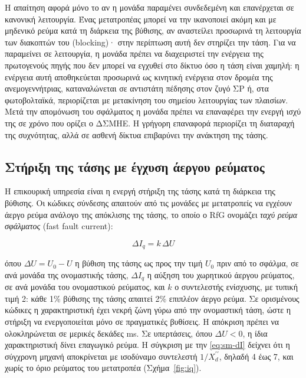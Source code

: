 Η απαίτηση αφορά μόνο το αν η μονάδα παραμένει συνδεδεμένη και επανέρχεται σε κανονική
λειτουργία. Ένας μετατροπέας μπορεί να την ικανοποιεί ακόμη και με μηδενικό ρεύμα κατά τη
διάρκεια της βύθισης, αν αναστείλει προσωρινά τη λειτουργία των διακοπτών του (blocking)· στην
περίπτωση αυτή δεν στηρίζει την τάση. Για να παραμείνει σε λειτουργία, η μονάδα πρέπει να
διαχειριστεί την ενέργεια της πρωτογενούς πηγής που δεν μπορεί να εγχυθεί στο δίκτυο όσο η
τάση είναι χαμηλή: η ενέργεια αυτή αποθηκεύεται προσωρινά ως κινητική ενέργεια στον δρομέα της
ανεμογεννήτριας, καταναλώνεται σε αντιστάτη πέδησης στον ζυγό ΣΡ ή, στα φωτοβολταϊκά,
περιορίζεται με μετακίνηση του σημείου λειτουργίας των πλαισίων. Μετά την απομόνωση του
σφάλματος η μονάδα πρέπει να επαναφέρει την ενεργή ισχύ της σε χρόνο που ορίζει ο ΔΣΜΗΕ. Η
γρήγορη επαναφορά περιορίζει τη διαταραχή της συχνότητας, αλλά σε ασθενή δίκτυα επιβαρύνει την
ανάκτηση της τάσης.

\subsection{Στήριξη της τάσης με έγχυση άεργου ρεύματος}
\label{sec:kfactor}

Η επικουρική υπηρεσία είναι η ενεργή στήριξη της τάσης κατά τη διάρκεια της βύθισης. Οι
κώδικες σύνδεσης απαιτούν από τις μονάδες με μετατροπείς να εγχέουν άεργο ρεύμα ανάλογο της
απόκλισης της τάσης, το οποίο ο RfG ονομάζει \emph{ταχύ ρεύμα σφάλματος} (fast fault current):

\begin{equation}
\Delta I_q = k\,\Delta U
\label{eq:kfactor}
\end{equation}

όπου $\Delta U = U_0 - U$ η βύθιση της τάσης ως προς την τιμή $U_0$ πριν από το σφάλμα, σε ανά
μονάδα της ονομαστικής τάσης, $\Delta I_q$ η αύξηση του χωρητικού άεργου ρεύματος, σε ανά
μονάδα του ονομαστικού ρεύματος, και $k$ ο συντελεστής ενίσχυσης, με τυπική τιμή 2: κάθε 1\%
βύθισης της τάσης απαιτεί 2\% επιπλέον άεργο ρεύμα. Σε ορισμένους κώδικες η χαρακτηριστική
έχει νεκρή ζώνη γύρω από την ονομαστική τάση, ώστε η στήριξη να ενεργοποιείται μόνο σε
πραγματικές βυθίσεις. Η απόκριση πρέπει να ολοκληρώνεται σε μερικές δεκάδες ms. Σε υπερτάσεις,
όπου $\Delta U < 0$, η ίδια χαρακτηριστική δίνει επαγωγικό ρεύμα. Η σύγκριση με την
\eqref{eq:sm-dI} δείχνει ότι η σύγχρονη μηχανή αποκρίνεται με ισοδύναμο συντελεστή
$1/X_d^{\prime\prime}$, δηλαδή 4 έως 7, και χωρίς το όριο ρεύματος του μετατροπέα
(Σχήμα~\ref{fig:iq}).

